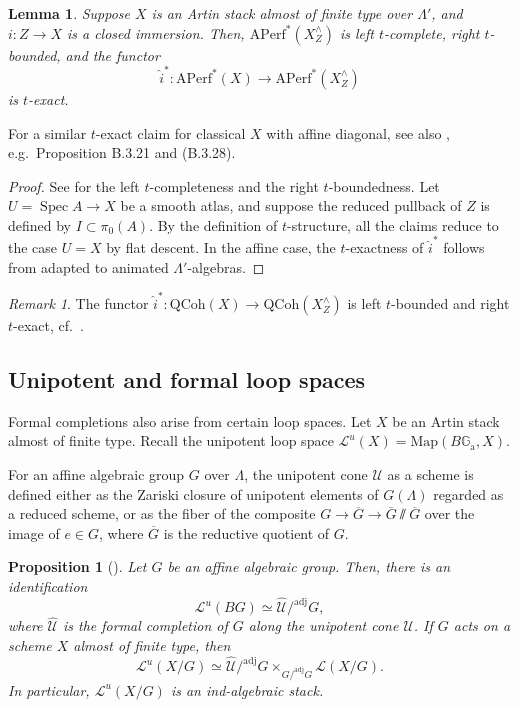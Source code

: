 \documentclass{amsart}
\newtheorem{lemma}[theorem]{Lemma}
\newtheorem{proposition}[theorem]{Proposition}
\theoremstyle{definition}
\theoremstyle{remark}
\newtheorem{remark}[theorem]{Remark}
\numberwithin{equation}{section}
\DeclareMathOperator{\Spec}{Spec}
\newcommand{\mc}{\mathcal}
\newcommand{\wh}{\widehat}
\newcommand{\QCoh}{\mathrm{QCoh}}
\newcommand{\Ga}{\mathbb{G}_{\mathrm{a}}}
\newcommand{\Map}{\mathrm{Map}}
\newcommand{\Aperf}{\mathrm{APerf}}
\newcommand{\adj}{\mathrm{adj}}
\begin{document}
\begin{lemma}\label{lem: completion_is_texact}
Suppose $X$ is an Artin stack almost of finite type over $\Lambda'$, and $i\colon Z\to X$ is a closed immersion. Then, $\Aperf^*(X^\wedge_Z)$ is left $t$-complete, right $t$-bounded, and the functor
\[
\wh{i}^*\colon \Aperf^* (X)\to \Aperf^*(X^\wedge_Z)
\]
is $t$-exact.  
\end{lemma}

For a similar $t$-exact claim for classical $X$ with affine diagonal, see also \cite[Appendix B]{DottoEmertonGee}, e.g.~Proposition B.3.21 and (B.3.28). 

\begin{proof}
See \cite[Proposition 2.1.11]{HalpernLeistnerPreygel} for the left $t$-completeness and the right $t$-boundedness. Let $U=\Spec A\to X$ be a smooth atlas, and suppose the reduced pullback of $Z$ is defined by $I\subset \pi_0(A)$. By the definition of $t$-structure, all the claims reduce to the case $U=X$ by flat descent. In the affine case, the $t$-exactness of $\wh{i}^*$ follows from \cite[Proposition 4.3.8, Corollary 4.3.9]{LurieDAGXII} adapted to animated $\Lambda'$-algebras. 
\end{proof}

\begin{remark}
The functor $\wh{i}^*\colon \QCoh(X)\to \QCoh(X^\wedge_Z)$ is left $t$-bounded and right $t$-exact, cf.~\cite[Lemma 2.2.1]{HalpernLeistnerPreygel}. 
\end{remark}

\subsection{Unipotent and formal loop spaces}{\label{ss: loopspaces}}
Formal completions also arise from certain loop spaces. Let $X$ be an Artin stack almost of finite type. Recall the unipotent loop space $\mc L^u(X)=\Map(B\Ga ,X)$. 

For an affine algebraic group $G$ over $\Lambda$, the unipotent cone $\mc U$ as a scheme  \cite[\S4.2]{Cotner} is defined either as the Zariski closure of unipotent elements of $G(\Lambda)$ regarded as a reduced scheme, or as the fiber of the composite $G\to \overline{G} \to \overline{G} \sslash \overline{G}$ over the image of $e\in G$, where $\overline{G}$ is the reductive quotient of $G$.  

\begin{proposition}[{\cite[Proposition 2.1.25]{Chenequivariant}}]
Let $G$ be an affine algebraic group. Then, there is an identification
\[
\mc L^u (BG) \simeq \wh{\mc U}/^\adj G, 
\]
where $\wh{\mc U}$ is the formal completion of $G$ along the unipotent cone $\mc U$. If $G$ acts on a scheme $X$ almost of finite type, then
\[
\mc L^u (X/G) \simeq \wh{\mc U}/^\adj G\times_{G/^\adj G}\mc L(X/G). 
\]
In particular, $\mc L^u (X/G)$ is an ind-algebraic stack. 
\end{proposition}
\end{document}
